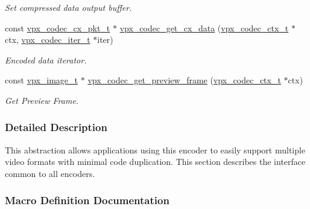 \begin{DoxyCompactItemize}
\begin{DoxyCompactList}\small\item\em Set compressed data output buffer. \end{DoxyCompactList}\item 
const \hyperlink{group__encoder_ga3f711e17fbefac545e8959ef5a023556}{vpx\+\_\+codec\+\_\+cx\+\_\+pkt\+\_\+t} $\ast$ \hyperlink{group__encoder_gae81cab25d66cf3bc59f1f75f8a5af720}{vpx\+\_\+codec\+\_\+get\+\_\+cx\+\_\+data} (\hyperlink{group__codec_gad03e2dfa6ae511db7d25be6bbb336233}{vpx\+\_\+codec\+\_\+ctx\+\_\+t} $\ast$ctx, \hyperlink{group__codec_ga6ea348f76b1f8a1fe50e14db684146c6}{vpx\+\_\+codec\+\_\+iter\+\_\+t} $\ast$iter)
\begin{DoxyCompactList}\small\item\em Encoded data iterator. \end{DoxyCompactList}\item 
const \hyperlink{vpx__image_8h_abf5ac962cc6d71b4f0e39b1b0d033e55}{vpx\+\_\+image\+\_\+t} $\ast$ \hyperlink{group__encoder_ga250aee4536aa2475e85cf61c9710c963}{vpx\+\_\+codec\+\_\+get\+\_\+preview\+\_\+frame} (\hyperlink{group__codec_gad03e2dfa6ae511db7d25be6bbb336233}{vpx\+\_\+codec\+\_\+ctx\+\_\+t} $\ast$ctx)
\begin{DoxyCompactList}\small\item\em Get Preview Frame. \end{DoxyCompactList}\end{DoxyCompactItemize}


\subsubsection{Detailed Description}
This abstraction allows applications using this encoder to easily support multiple video formats with minimal code duplication. This section describes the interface common to all encoders. 

\subsubsection{Macro Definition Documentation}
